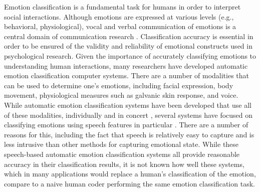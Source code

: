 \documentclass{article}
\begin{document}
	\let\thefootnote\relax{}
Emotion classification is a fundamental task for humans in order to interpret social interactions. Although emotions are expressed at various levels (e.g., behavioral, physiological), vocal and verbal communication of emotions  is a central domain of communication research \cite{scherer1986vocal}. Classification accuracy is essential in order to be ensured of the validity and reliability of emotional constructs used in psychological research.
Given the importance of accurately classifying emotions to understanding human interactions, many researchers have developed automatic emotion classification computer systems.  There are a number of modalities that can be used to determine one's emotions, including facial expression, body movement, physiological measures such as galvanic skin response, and voice.  While automatic emotion classification systems have been developed that use all of these modalities, individually and in concert \cite{Busso:2004:AER:1027933.1027968,huisman2013lemtool,ozkul2012multimodal,wu2013two}, several systems have focused on classifying emotions using speech features in particular \cite{yang2012speech, bitouk2010class,rachuri2010emotionsense,sethu2008empirical}.  There are a number of reasons for this, including the fact that speech is relatively easy to capture and is less intrusive than other methods for capturing emotional state.  While these speech-based automatic emotion classification systems all provide reasonable accuracy in their classification results, it is not known how well these systems, which in many applications would replace a human's classification of the emotion, compare to a naive human coder performing the same emotion classification task. \par
\end{document}

